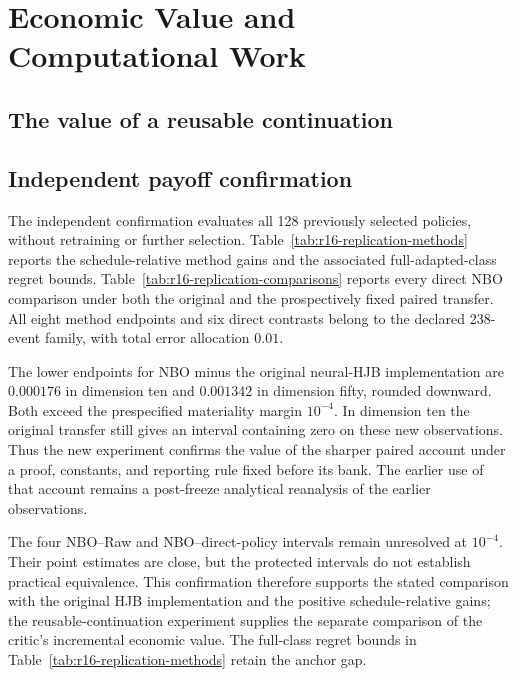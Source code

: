 \section{Economic Value and Computational Work}\label{sec:r16results}
\subsection{The value of a reusable continuation}\label{sec:r16reuseresults}


\subsection{Independent payoff confirmation}\label{sec:r16replicationresults}
The independent confirmation evaluates all 128 previously selected policies,
without retraining or further selection. Table~\ref{tab:r16-replication-methods}
reports the schedule-relative method gains and the associated full-adapted-class
regret bounds. Table~\ref{tab:r16-replication-comparisons} reports every direct
NBO comparison under both the original and the prospectively fixed paired
transfer. All eight method endpoints and six direct contrasts belong to the
declared 238-event family, with total error allocation $0.01$.




The lower endpoints for NBO minus the original neural-HJB implementation are
$0.000176$ in dimension ten and $0.001342$ in dimension fifty, rounded
downward. Both exceed the prespecified materiality margin $10^{-4}$.
In dimension ten the original transfer still gives an interval containing
zero on these new observations. Thus the new experiment confirms the value
of the sharper paired account under a proof, constants, and reporting rule
fixed before its bank. The earlier use of that account remains a post-freeze
analytical reanalysis of the earlier observations.

The four NBO--Raw and NBO--direct-policy intervals remain unresolved at
$10^{-4}$. Their point estimates are close, but the protected intervals do
not establish practical equivalence. This confirmation therefore supports
the stated comparison with the original HJB implementation and the positive
schedule-relative gains; the reusable-continuation experiment supplies the
separate comparison of the critic's incremental economic value. The full-class
regret bounds in Table~\ref{tab:r16-replication-methods} retain the anchor gap.

